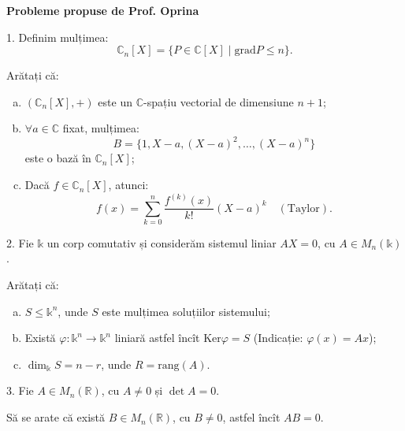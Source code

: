 \documentclass[11pt,a4paper]{article}
\newcommand\RR{\mathbb{R}}
\newcommand\CC{\mathbb{C}}
\newcommand\Bbbk{\mathbb{k}}
\theoremstyle{dotless}
\theoremstyle{dotlessdr}
\begin{document}
\begin{center}
  {\large\textbf{Probleme propuse de Prof. Oprina }}
\end{center}

\vspace{1cm}


1. Definim mulțimea:
\[
  \CC_n[X] = \{ P \in \CC[X] \mid \mathrm{grad} P \leq n \}.
\]

Arătați că:
\begin{enumerate}[(a)]
\item $(\CC_n[X], +)$ este un $\CC$-spațiu vectorial de dimensiune $n + 1$;
\item $\forall a \in \CC$ fixat, mulțimea:
  \[
    B = \{1, X - a, (X - a)^2, \dots, (X - a)^n \}
  \]
  este o bază în $\CC_n[X]$;
\item Dacă $f \in \CC_n[X]$, atunci:
  \[
    f(x) = \sum_{k = 0}^n \frac{f^{(k)}(x)}{k!} (X - a)^k \quad (\text{Taylor}).
  \]
\end{enumerate}

\vspace{1cm}

2. Fie $\Bbbk$ un corp comutativ și considerăm sistemul liniar $AX = 0$,
cu $A \in M_n(\Bbbk)$.

Arătați că:
\begin{enumerate}[(a)]
\item $S \leq \Bbbk^n$, unde $S$ este mulțimea soluțiilor sistemului;
\item Există $\varphi : \Bbbk^n \to \Bbbk^n$ liniară astfel încît $\mathrm{Ker} \varphi = S$ (Indicație: $\varphi(x) = Ax$);
\item $\dim_\Bbbk S = n - r$, unde $R = \mathrm{rang}(A)$.
\end{enumerate}

\vspace{1cm}

3. Fie $A \in M_n(\RR)$, cu $A \neq 0$ și $\det A = 0$.

Să se arate că există $B \in M_n(\RR)$, cu $B \neq 0$, astfel încît $AB = 0$.
\end{document}
